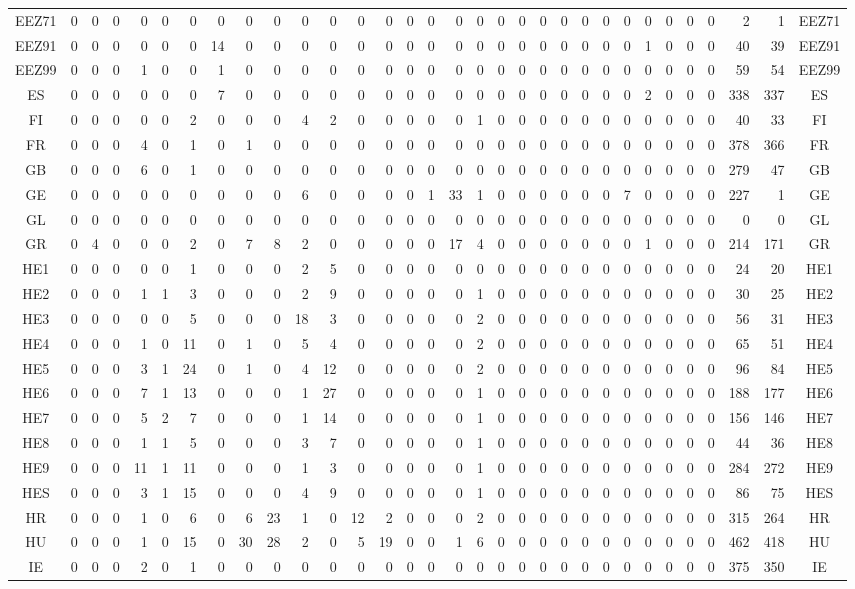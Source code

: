 \documentclass[10pt,a4paper,twoside]{report}
\begin{document}
{\begin{tabular}{crrrrrrrrrrrrrrrrrrrrrrrrrrrrrrc}
EEZ71&0&0&0&0&0&0&0&0&0&0&0&0&0&0&0&0&0&0&0&0&0&0&0&0&0&0&0&0&2&1&EEZ71\\
EEZ91&0&0&0&0&0&0&14&0&0&0&0&0&0&0&0&0&0&0&0&0&0&0&0&0&1&0&0&0&40&39&EEZ91\\
EEZ99&0&0&0&1&0&0&1&0&0&0&0&0&0&0&0&0&0&0&0&0&0&0&0&0&0&0&0&0&59&54&EEZ99\\
ES&0&0&0&0&0&0&7&0&0&0&0&0&0&0&0&0&0&0&0&0&0&0&0&0&2&0&0&0&338&337&ES\\
FI&0&0&0&0&0&2&0&0&0&4&2&0&0&0&0&0&1&0&0&0&0&0&0&0&0&0&0&0&40&33&FI\\
FR&0&0&0&4&0&1&0&1&0&0&0&0&0&0&0&0&0&0&0&0&0&0&0&0&0&0&0&0&378&366&FR\\
GB&0&0&0&6&0&1&0&0&0&0&0&0&0&0&0&0&0&0&0&0&0&0&0&0&0&0&0&0&279&47&GB\\
GE&0&0&0&0&0&0&0&0&0&6&0&0&0&0&1&33&1&0&0&0&0&0&0&7&0&0&0&0&227&1&GE\\
GL&0&0&0&0&0&0&0&0&0&0&0&0&0&0&0&0&0&0&0&0&0&0&0&0&0&0&0&0&0&0&GL\\
GR&0&4&0&0&0&2&0&7&8&2&0&0&0&0&0&17&4&0&0&0&0&0&0&0&1&0&0&0&214&171&GR\\
HE1&0&0&0&0&0&1&0&0&0&2&5&0&0&0&0&0&0&0&0&0&0&0&0&0&0&0&0&0&24&20&HE1\\
HE2&0&0&0&1&1&3&0&0&0&2&9&0&0&0&0&0&1&0&0&0&0&0&0&0&0&0&0&0&30&25&HE2\\
HE3&0&0&0&0&0&5&0&0&0&18&3&0&0&0&0&0&2&0&0&0&0&0&0&0&0&0&0&0&56&31&HE3\\
HE4&0&0&0&1&0&11&0&1&0&5&4&0&0&0&0&0&2&0&0&0&0&0&0&0&0&0&0&0&65&51&HE4\\
HE5&0&0&0&3&1&24&0&1&0&4&12&0&0&0&0&0&2&0&0&0&0&0&0&0&0&0&0&0&96&84&HE5\\
HE6&0&0&0&7&1&13&0&0&0&1&27&0&0&0&0&0&1&0&0&0&0&0&0&0&0&0&0&0&188&177&HE6\\
HE7&0&0&0&5&2&7&0&0&0&1&14&0&0&0&0&0&1&0&0&0&0&0&0&0&0&0&0&0&156&146&HE7\\
HE8&0&0&0&1&1&5&0&0&0&3&7&0&0&0&0&0&1&0&0&0&0&0&0&0&0&0&0&0&44&36&HE8\\
HE9&0&0&0&11&1&11&0&0&0&1&3&0&0&0&0&0&1&0&0&0&0&0&0&0&0&0&0&0&284&272&HE9\\
HES&0&0&0&3&1&15&0&0&0&4&9&0&0&0&0&0&1&0&0&0&0&0&0&0&0&0&0&0&86&75&HES\\
HR&0&0&0&1&0&6&0&6&23&1&0&12&2&0&0&0&2&0&0&0&0&0&0&0&0&0&0&0&315&264&HR\\
HU&0&0&0&1&0&15&0&30&28&2&0&5&19&0&0&1&6&0&0&0&0&0&0&0&0&0&0&0&462&418&HU\\
IE&0&0&0&2&0&1&0&0&0&0&0&0&0&0&0&0&0&0&0&0&0&0&0&0&0&0&0&0&375&350&IE\\

\end{tabular}}
\end{document}
